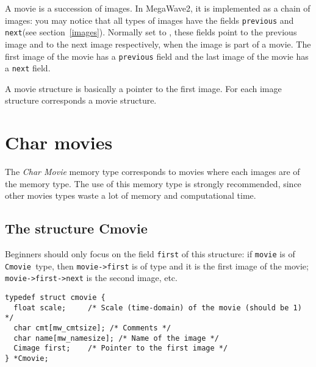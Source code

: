 %
%

A movie is a succession of images. In MegaWave2, it is implemented as a
chain of images: you may notice that all types of images have the 
fields \verb+previous+ and \verb+next+(see section~\ref{images}). 
Normally set to \Null, these fields point to the previous image and
to the next image respectively, when the image is part of a movie.
The first image of the movie has a \Null \verb+previous+ field and the
last image of the movie has a \Null \verb+next+ field.

A movie structure is basically a pointer to the first image.
For each image structure corresponds a movie structure.

\section{Char movies}


\label{movies_char-movies}
\def\cmovie{{\tt Cmovie }}
\index{structure!\cmovie}


The {\em Char Movie} memory type corresponds to movies where each images
are of the \cimage memory type. 
The use of this memory type is strongly recommended, since other movies types
waste a lot of memory and computational time.

\subsection{The structure Cmovie}
\label{movies_char-movies_structure}

 Beginners should only focus on the field \verb+first+ of this structure:
if \verb+movie+ is of \cmovie type, then \verb+movie->first+ is of \cimage
type and it is the first image of the movie; \verb+movie->first->next+ is
the second image, etc.

{\small
\begin{verbatim}
typedef struct cmovie {
  float scale;     /* Scale (time-domain) of the movie (should be 1) */
  char cmt[mw_cmtsize]; /* Comments */
  char name[mw_namesize]; /* Name of the image */
  Cimage first;    /* Pointer to the first image */
} *Cmovie;
\end{verbatim}
}

